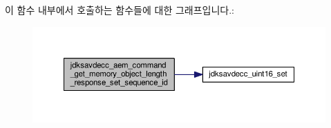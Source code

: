이 함수 내부에서 호출하는 함수들에 대한 그래프입니다.\+:
\nopagebreak
\begin{figure}[H]
\begin{center}
\leavevmode
\includegraphics[width=350pt]{group__command__aem__get__memory__object__length__response_ga17f00824ad62948af4067c7957b9b517_cgraph}
\end{center}
\end{figure}


